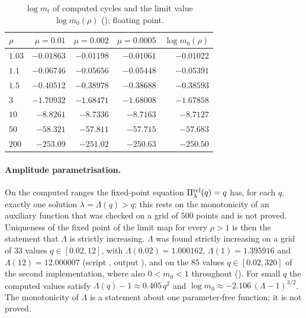\begin{table}[ht]
\centering\small
\caption{$\log m_t$ of computed cycles and the limit value $\log m_0(\rho)$ (\protect{}); floating point.}\label{wed:tab:logmt}
\begin{tabular}{lrrrr}
\toprule
$\rho$ & $\mu=0.01$ & $\mu=0.002$ & $\mu=0.0005$ & $\log m_0(\rho)$\\
\midrule
$1.03$ & $-0.01863$ & $-0.01198$ & $-0.01061$ & $-0.01022$\\
$1.1$ & $-0.06746$ & $-0.05656$ & $-0.05448$ & $-0.05391$\\
$1.5$ & $-0.40512$ & $-0.38978$ & $-0.38688$ & $-0.38593$\\
$3$ & $-1.70932$ & $-1.68471$ & $-1.68008$ & $-1.67858$\\
$10$ & $-8.8261$ & $-8.7336$ & $-8.7163$ & $-8.7127$\\
$50$ & $-58.321$ & $-57.811$ & $-57.715$ & $-57.683$\\
$200$ & $-253.09$ & $-251.02$ & $-250.63$ & $-250.50$\\
\bottomrule
\end{tabular}
\end{table}

\paragraph{Amplitude parametrisation.}
On the computed ranges the fixed-point equation $\Pi^{\rm rel}_\lambda(q)=q$ has, for each $q$, exactly one solution $\lambda=\Lambda(q)>q$; this rests on the monotonicity of an auxiliary function that was checked on a grid of $500$ points and is not proved. Uniqueness of the fixed point of the limit map for every $\rho>1$ is then the statement that $\Lambda$ is strictly increasing. $\Lambda$ was found strictly increasing on a grid of $33$ values $q\in[0.02,12]$, with $\Lambda(0.02)=1.000162$, $\Lambda(1)=1.395916$ and $\Lambda(12)=12.000007$ (script , output ), and on the $85$ values $q\in[0.02,320]$ of the second implementation, where also $0<m_0<1$ throughout (). For small $q$ the computed values satisfy $\Lambda(q)-1\approx0.405\,q^2$ and $\log m_0\approx-2.106\,(\Lambda-1)^{3/2}$. The monotonicity of $\Lambda$ is a statement about one parameter-free function; it is not proved.

